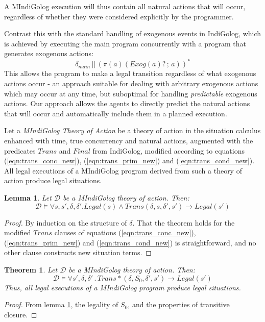 \documentclass[times, 10pt, twocolumn]{article}
\newtheorem{lemma}{Lemma}
\newtheorem{thm}{Theorem}
\begin{document}
A MIndiGolog execution will thus contain all natural actions that
will occur, regardless of whether they were considered explicitly
by the programmer.

Contrast this with the standard handling of exogenous events in IndiGolog,
which is achieved by executing the main program concurrently with
a program that generates exogenous actions:\[
\delta_{main}\,||\,\left(\pi(a)(Exog(a)?\,;\, a)\right)^{*}\]
 This allows the program to make a legal transition regardless of
what exogenous actions occur - an approach suitable for dealing with
arbitrary exogenous actions which may occur at any time, but suboptimal
for handling \emph{predictable} exogenous actions. Our approach allows
the agents to directly predict the natural actions that will occur
and automatically include them in a planned execution.


Let a \emph{MIndiGolog Theory of Action} be a theory of action in
the situation calculus enhanced with time, true concurrency and natural
actions, augmented with the predicates $Trans$ and $Final$ from
IndiGolog, modified according to equations (\ref{eqn:trans_conc_new}),
(\ref{eqn:trans_prim_new}) and (\ref{eqn:trans_cond_new}). All legal
executions of a MIndiGolog program derived from such a theory of action
produce legal situations.
\begin{lemma} Let $\mathcal{D}$ be a MIndiGolog theory of action.
Then:\label{thm:trans_legal}\[
\mathcal{D}\models\forall s,s',\delta,\delta'.Legal(s)\wedge Trans(\delta,s,\delta',s')\rightarrow Legal(s')\]
\end{lemma} \begin{proof} By induction on the structure of $\delta$.
That the theorem holds for the modified $Trans$ clauses of equations
(\ref{eqn:trans_conc_new}), (\ref{eqn:trans_prim_new}) and (\ref{eqn:trans_cond_new})
is straightforward, and no other clause constructs new situation terms.
\end{proof} 

\begin{thm} Let $\mathcal{D}$ be a MIndiGolog theory of action.
Then: \[
\mathcal{D}\models\forall s',\delta,\delta'\,.\, Trans*(\delta,S_{0},\delta',s')\rightarrow Legal(s')\]
Thus, all legal executions of a MIndiGolog program produce
legal situations. \end{thm} \begin{proof} From lemma \ref{thm:trans_legal},
the legality of $S_{0}$, and the properties of transitive closure.
\end{proof} 
\end{document}
